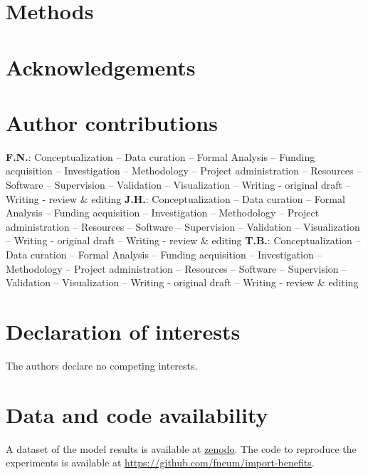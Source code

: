\documentclass[5p,9pt]{elsarticle}
\renewcommand{\ttdefault}{\sfdefault}
\begin{document}


\section*{Methods}

\label{sec:methods}



\section*{Acknowledgements}



\section*{Author contributions}


\textbf{F.N.}:
Conceptualization --
Data curation --
Formal Analysis --
Funding acquisition --
Investigation --
Methodology --
Project administration --
Resources --
Software --
Supervision --
Validation --
Visualization --
Writing - original draft --
Writing - review \& editing
\textbf{J.H.}:
Conceptualization --
Data curation --
Formal Analysis --
Funding acquisition --
Investigation --
Methodology --
Project administration --
Resources --
Software --
Supervision --
Validation --
Visualization --
Writing - original draft --
Writing - review \& editing
\textbf{T.B.}:
Conceptualization --
Data curation --
Formal Analysis --
Funding acquisition --
Investigation --
Methodology --
Project administration --
Resources --
Software --
Supervision --
Validation --
Visualization --
Writing - original draft --
Writing - review \& editing

\section*{Declaration of interests}

The authors declare no competing interests.

\section*{Data and code availability} 

A dataset of the model results is available at \url{zenodo}.
The code to reproduce the experiments is available at \url{https://github.com/fneum/import-benefits}.

\renewcommand{\ttdefault}{\sfdefault}
% 


\setcounter{LastMainFigure}{\value{figure}}
\end{document}
